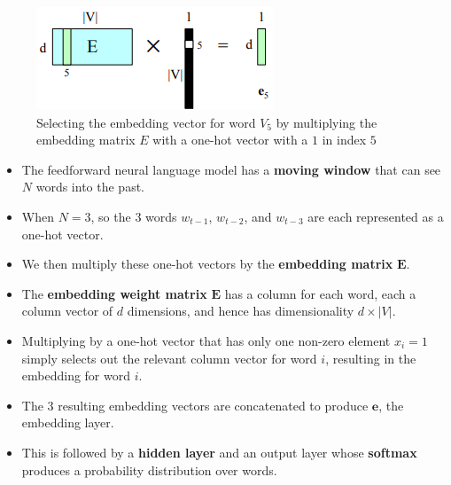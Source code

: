 \begin{table}[H]
    \begin{minipage}{0.45\linewidth}
        \begin{figure}[H]
            \includegraphics[width=\linewidth]{Pictures/nlp/fig-7-16.png}
            \caption{Selecting the embedding vector for word $V_5$ by multiplying the embedding matrix $E$ with a one-hot vector with a $1$ in index $5$}
        \end{figure}
    \end{minipage}
    \hfill
    \begin{minipage}{0.65\linewidth}
        \begin{itemize}
            \item The feedforward neural language model has a \textbf{moving window} that can see $N$ words into the past.

            \item When $N=3$, so the $3$ words $w_{t-1}$, $w_{t-2}$, and $w_{t-3}$ are each represented as a one-hot vector.

            \item We then multiply these one-hot vectors by the \textbf{embedding matrix} $\mathbf{E}$.

            \item The \textbf{embedding weight matrix}\label{embedding weight matrix} $\mathbf{E}$ has a column for each word, each a column vector of $d$ dimensions, and hence has dimensionality $d \times |V|$. 
            
            \item Multiplying by a one-hot vector that has only one non-zero element $x_i = 1$ simply selects out the relevant column vector for word $i$, resulting in the embedding for word $i$.

            \item The 3 resulting embedding vectors are concatenated to produce $\mathbf{e}$, the embedding layer. 
            
            \item This is followed by a \textbf{hidden layer} and an output layer whose \textbf{softmax} produces a probability distribution over words.
        \end{itemize}
    \end{minipage}
\end{table}
